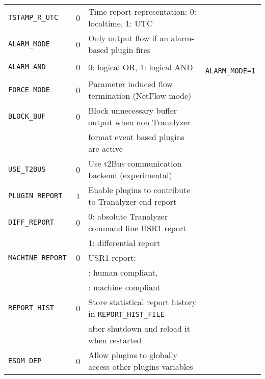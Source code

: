 \begin{longtable}{>{\tt}lcl>{\tt\small}l}
    TSTAMP\_R\_UTC           & 0                  & Time report representation: 0: localtime, 1: UTC                    & \\
    ALARM\_MODE              & 0                  & Only output flow if an alarm-based plugin fires                     & \\
    ALARM\_AND               & 0                  & 0: logical OR, 1: logical AND                                       & ALARM\_MODE=1\\
    FORCE\_MODE              & 0                  & Parameter induced flow termination (NetFlow mode)                   & \\
    BLOCK\_BUF               & 0                  & Block unnecessary buffer output when non Tranalyzer                 & \\
                             &                    & format event based plugins are active                               & \\
    USE\_T2BUS               & 0                  & Use t2Bus communication backend (experimental)                      & \\
    PLUGIN\_REPORT           & 1                  & Enable plugins to contribute to Tranalyzer end report               & \\
    DIFF\_REPORT             & 0                  & 0: absolute Tranalyzer command line USR1 report                     & \\
                             &                    & 1: differential report                                              & \\
    MACHINE\_REPORT          & 0                  & USR1 report:                                                        & \\
                             &                    & \qquad 0: human compliant,                                          & \\
                             &                    & \qquad 1: machine compliant                                         & \\
    REPORT\_HIST             & 0                  & Store statistical report history in {\tt\small REPORT\_HIST\_FILE}  & \\
                             &                    & after shutdown and reload it when restarted                         & \\
    ESOM\_DEP                & 0                  & Allow plugins to globally access other plugins variables            & \\

\end{longtable}
